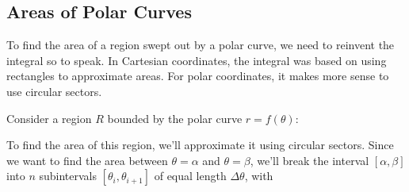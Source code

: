 \documentclass[10pt,]{book}
\theoremstyle{ptxplainnotitle}
\theoremstyle{ptxplaintitle}
\theoremstyle{ptxplainnotitle}
\theoremstyle{ptxplaintitle}
\theoremstyle{ptxplainnotitle}
\theoremstyle{ptxplaintitle}
\theoremstyle{ptxdefinitionnotitle}
\theoremstyle{ptxdefinitiontitle}
\theoremstyle{ptxdefinitionnotitle}
\theoremstyle{ptxdefinitiontitle}
\theoremstyle{ptxdefinitionnotitle}
\theoremstyle{ptxdefinitiontitle}
\theoremstyle{ptxdefinitionnotitle}
\theoremstyle{ptxdefinitiontitle}
\theoremstyle{ptxdefinitionnotitle}
\theoremstyle{ptxdefinitiontitle}
\numberwithin{equation}{section}
\begin{document}
\subsection[{Areas of Polar Curves}]{Areas of Polar Curves}\label{subsection-areas-of-polar-curves}
\hypertarget{p-695}{}%
To find the area of a region swept out by a polar curve, we need to reinvent the integral so to speak. In Cartesian coordinates, the integral was based on using rectangles to approximate areas. For polar coordinates, it makes more sense to use circular sectors.%
\par
\hypertarget{p-696}{}%
Consider a region \(R\) bounded by the polar curve \(r = f(\theta)\):%
\begin{figure}
\centering
{
}
\end{figure}
\hypertarget{p-697}{}%
To find the area of this region, we'll approximate it using circular sectors. Since we want to find the area between \(\theta=\alpha\) and \(\theta=\beta\), we'll break the interval \([\alpha,\beta]\) into \(n\) subintervals \([\theta_{i},\theta_{i+1}]\) of equal length \(\Delta\theta\), with%
\end{document}
